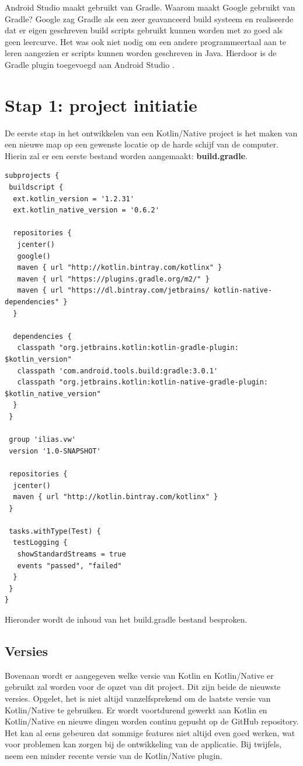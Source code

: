 Android Studio maakt gebruikt van Gradle. Waarom maakt Google gebruikt van Gradle? Google zag Gradle als een zeer geavanceerd build systeem en realiseerde dat er eigen geschreven build scripts gebruikt kunnen worden met zo goed als geen leercurve. Het was ook niet nodig om een andere programmeertaal aan te leren aangezien er scripts kunnen worden geschreven in Java. Hierdoor is de Gradle plugin toegevoegd aan Android Studio \autocite{GoogleGradle}.

\section{Stap 1: project initiatie}
De eerste stap in het ontwikkelen van een Kotlin/Native project is het maken van een nieuwe map op een gewenste locatie op de harde schijf van de computer. Hierin zal er een eerste bestand worden aangemaakt: \textbf{build.gradle}.

\begin{lstlisting}
subprojects {
 buildscript {
  ext.kotlin_version = '1.2.31'
  ext.kotlin_native_version = '0.6.2'
		
  repositories {
   jcenter()
   google()
   maven { url "http://kotlin.bintray.com/kotlinx" }
   maven { url "https://plugins.gradle.org/m2/" }
   maven { url "https://dl.bintray.com/jetbrains/ kotlin-native-dependencies" }
  }

  dependencies {
   classpath "org.jetbrains.kotlin:kotlin-gradle-plugin: $kotlin_version"
   classpath 'com.android.tools.build:gradle:3.0.1'
   classpath "org.jetbrains.kotlin:kotlin-native-gradle-plugin: $kotlin_native_version"
  }
 }
	
 group 'ilias.vw'
 version '1.0-SNAPSHOT'
	
 repositories {
  jcenter()
  maven { url "http://kotlin.bintray.com/kotlinx" }
 }
	
 tasks.withType(Test) {
  testLogging {
   showStandardStreams = true
   events "passed", "failed"
  }
 }
}
\end{lstlisting}
Hieronder wordt de inhoud van het build.gradle bestand besproken.
\subsection{Versies}
Bovenaan wordt er aangegeven welke versie van Kotlin en Kotlin/Native er gebruikt zal worden voor de opzet van dit project. Dit zijn beide de nieuwste versies. Opgelet, het is niet altijd vanzelfsprekend om de laatste versie van Kotlin/Native te gebruiken. Er wordt voortdurend gewerkt aan Kotlin en Kotlin/Native en nieuwe dingen worden continu gepusht op de GitHub repository. Het kan al eens gebeuren dat sommige features niet altijd even goed werken, wat voor problemen kan zorgen bij de ontwikkeling van de applicatie. Bij twijfels, neem een minder recente versie van de Kotlin/Native plugin.

